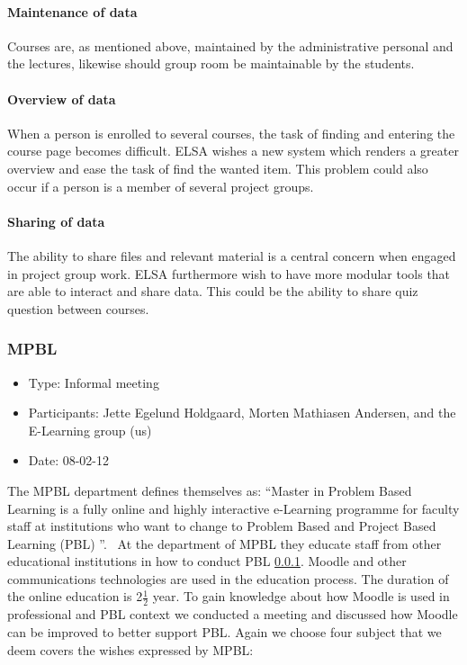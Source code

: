 \paragraph{Maintenance of data} Courses are, as mentioned above, maintained by the administrative personal and the lectures, likewise should group room be maintainable by the students. 
\paragraph{Overview of data} When a person is enrolled to several courses, the task of finding and entering the course page becomes difficult. 
ELSA wishes a new system which renders a greater overview and ease the task of find the wanted item. 
This problem could also occur if a person is a member of several project groups.
\paragraph{Sharing of data} The ability to share files and relevant material is a central concern when engaged in project group work. ELSA furthermore wish to have more modular tools that are able to interact and share data.
This could be the ability to share quiz question between courses. 


\subsubsection{MPBL}
\begin{itemize}
	\item Type: Informal meeting
	\item Participants: Jette Egelund Holdgaard, Morten Mathiasen Andersen, and the E-Learning group (us)
	\item Date: 08-02-12
\end{itemize}
The MPBL department defines themselves as:
``Master in Problem Based Learning is a fully online and highly interactive e-Learning programme for faculty staff at institutions who want to change to Problem Based and Project Based Learning (PBL) ''.~\cite{mpbl}
At the department of MPBL they educate staff from other educational institutions in how to conduct PBL \ref{}.
Moodle and other communications technologies are used in the education process. 
The duration of the online education is 2$\frac{1}{2}$ year.
To gain knowledge about how Moodle is used in professional and PBL context we conducted a meeting and discussed how Moodle can be improved to better support PBL. Again we choose four subject that we deem covers the wishes expressed by MPBL:

